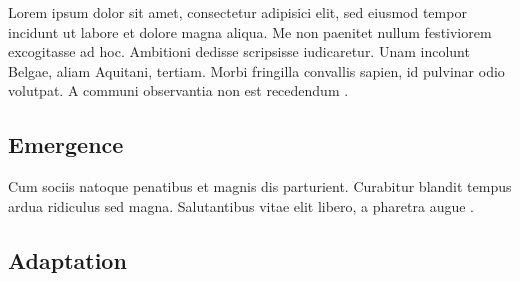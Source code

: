 Lorem ipsum dolor sit amet, consectetur adipisici elit, sed eiusmod tempor incidunt ut labore et dolore magna aliqua. Me non paenitet nullum festiviorem excogitasse ad hoc. Ambitioni dedisse scripsisse iudicaretur. Unam incolunt Belgae, aliam Aquitani, tertiam. Morbi fringilla convallis sapien, id pulvinar odio volutpat. A communi observantia non est recedendum \autocite{janssen2020}.

\subsection{Emergence}

\begin{guidingbox}
  \begin{tcbitemize}
    \item[\gddarkredb{\arrowbullet}] 
    \item[\gddarkcornflowerblueb{\arrowbullet}] 
  \end{tcbitemize}
\end{guidingbox}

Cum sociis natoque penatibus et magnis dis parturient. Curabitur blandit tempus ardua ridiculus sed magna. Salutantibus vitae elit libero, a pharetra augue \autocite{smaldino2023}.

\subsection{Adaptation}

